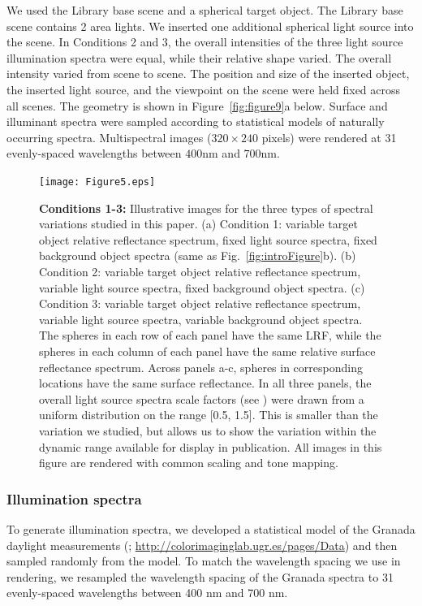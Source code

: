 \documentclass{jov}
\begin{document}
We used the Library base scene and a spherical target object.
The Library base scene contains 2 area lights. 
We inserted one additional spherical light source into the scene.
In Conditions 2 and 3, the overall intensities of the three light source illumination spectra were equal, while their relative shape varied. 
The overall intensity varied from scene to scene.
The position and size of the inserted object, the inserted light source, and the viewpoint on the scene were held fixed across all 
scenes. The geometry is shown in Figure~\ref{fig:figure9}a below.
Surface and illuminant spectra were sampled according to statistical models of naturally occurring spectra.
Multispectral images ($320 \times 240$ pixels) were rendered at 31 evenly-spaced wavelengths between $400$nm and $700$nm.

\begin{figure}
\centering   
\texttt{[image: Figure5.eps]}        
    \caption{{\bf Conditions 1-3:} Illustrative images for the three types of spectral variations studied in this paper. (a) Condition 1: variable target object relative reflectance spectrum, fixed light source spectra, fixed background object spectra (same as Fig.~\ref{fig:introFigure}b). 
(b) Condition 2: variable target object relative reflectance spectrum, variable light source spectra, fixed background object spectra. (c) Condition 3: variable target object relative reflectance spectrum, variable light source spectra, variable background object spectra. The spheres in each row of each panel have the same LRF, while the spheres in each column of each panel have the same relative surface reflectance spectrum.  Across panels a-c, spheres in corresponding locations have the same surface reflectance. In all three panels, the overall light source spectra scale factors (see ) were drawn from a uniform distribution on the range [0.5, 1.5]. This is smaller than the variation we studied, but allows us to show the variation within the dynamic range available for display in publication. All images in this figure are rendered with common scaling and tone mapping.} 
\label{fig:studiedCases}
\end{figure}

\subsubsection{Illumination spectra}
To generate illumination spectra, we developed a statistical model of the Granada daylight measurements (; \href{http://colorimaginglab.ugr.es/pages/Data}{http://colorimaginglab.ugr.es/pages/Data}) and then sampled randomly from the model.
To match the wavelength spacing we use in rendering, we resampled the wavelength spacing of the Granada spectra to
31 evenly-spaced wavelengths between 400 nm and 700 nm.
\end{document}
